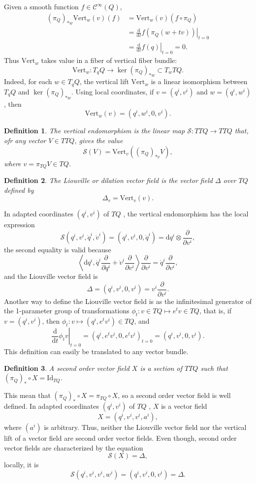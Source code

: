 \documentclass[11pt]{article}
\theoremstyle{plain}%
\newtheorem{defi}{Definition}[section]%
\newcommand{\dd}{{\mathrm{d}}}  %
\begin{document}
Given a smooth function $f\in \mathcal{C}^\infty(Q)$,
\[
	\begin{split}
		(\pi_Q)_{*w}\mathrm{Vert}_w(v)(f)&=\mathrm{Vert}_w(v)(f\circ \pi_Q)\\
		&=\left.\frac{\dd}{\dd t}f(\pi_Q(w+tv))\right|_{t=0}\\
		&=\left.\frac{\dd}{\dd t}f(q)\right|_{t=0}=0.
	\end{split}
\]
Thus $\mathrm{Vert}_w$ takes value in a fiber of vertical fiber bundle:
\[
	\mathrm{Vert}_w:T_qQ\to\ker(\pi_Q)_{*w}\subset T_wTQ.
\]
Indeed, for each $w \in T_q Q$, the vertical lift $\mathrm{Vert}_w$ is a linear isomorphism between $T_q Q$ and $\ker(\pi_Q)_{*w}$. Using local coordinates, if $v=(q^i,v^i)$ and $w=(q^i,w^i)$, then
\[
	\mathrm{Vert}_w(v)=(q^i,w^i,0,v^i).
\]
\begin{defi}
	The vertical endomorphism is the linear map $\mathcal{S}:TTQ\to TTQ$ that, ofr any vector $V \in TTQ$, gives the value
	\[
		\mathcal{S}(V)=\mathrm{Vert}_v\left(\left(\pi_Q\right)_{*v}V\right),
	\]
	where $v=\pi_{TQ}V\in TQ$.
\end{defi}
\begin{defi}
	The Liouville or dilation vector field is the vector field $\Delta$ over $TQ$ defined by
	\[
		\Delta_v=\mathrm{Vert}_v(v).
	\]
\end{defi}

In adapted coordinates $(q^i,v^i)$ of $T Q$ , the vertical endomorphism has the local expression 
\[
	\mathcal{S}(q^i,v^i,\dot{q}^i,\dot{v}^i)=(q^i,v^i,0,\dot{q}^i)=\dd q^i\otimes\frac{\partial}{\partial v^i},
\]
the second equality is valid because
\[
	\left\langle \dd q^i,\dot{q}^i\frac{\partial}{\partial q^i}+\dot{v}^i\frac{\partial}{\partial v^i}\right\rangle\frac{\partial}{\partial v^i}=\dot{q}^i\frac{\partial}{\partial v^i},
\]
and the Liouville vector field is 
\[
	\Delta=(q^i,v^i,0,v^i)=v^i\frac{\partial}{\partial v^i}.
\]
Another way to define the Liouville vector field is as the infinitesimal generator of the 1-parameter group of transformations $\phi_t : v \in T Q \mapsto e^t v \in T Q$, that is, if $v=(q^i,v^i)$, then $\phi_t : v  \mapsto (q^i,e^tv^i)\in T Q$, and
\[
	\left.\frac{\dd}{\dd t}\phi_tv\right|_{t=0}=(q^i,e^tv^i,0,e^tv^i)_{t=0}=(q^i,v^i,0,v^i).
\]
This definition can easily be translated to any vector bundle.
\begin{defi}
	A second order vector field $X$ is a section of $TTQ$ such that $(\pi_Q)_*\circ X=\mathrm{Id}_{TQ}$.
\end{defi}
This mean that $(\pi_Q)_*\circ X=\pi_{TQ}\circ X$, so a second order vector field is well defined. In adapted coordinates $(q^i,v^i)$ of $T Q$ , $X$ is a vector field
\[
	X = (q^i,v^i,v^i,a^i),
\]
where $(a^i)$ is arbitrary. Thus, neither the Liouville vector field nor the vertical lift of a vector field are second
order vector fields. Even though, second order vector fields are characterized by the equation
\[
	\mathcal{S}(X)=\Delta,
\]
locally, it is
\[
	\mathcal{S}(q^i,v^i,v^i,w^i)=(q^i,v^i,0,v^i)=\Delta.
\]
\end{document}
